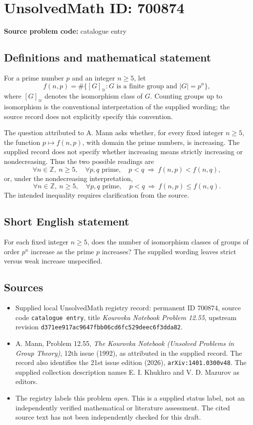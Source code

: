 \documentclass[11pt]{article}
\newcommand{\Z}{\mathbb{Z}}
\begin{document}
\section*{UnsolvedMath ID: 700874}
\textbf{Source problem code:} catalogue entry
\subsection{Definitions and mathematical statement}
For a prime number \(p\) and an integer \(n\geq 5\), let
\[
f(n,p)=\#\{[G]_{\cong}:G\text{ is a finite group and }|G|=p^n\},
\]
where \([G]_{\cong}\) denotes the isomorphism class of \(G\). Counting groups up to isomorphism is the conventional interpretation of the supplied wording; the source record does not explicitly specify this convention.

The question attributed to A. Mann asks whether, for every fixed integer \(n\geq 5\), the function \(p\mapsto f(n,p)\), with domain the prime numbers, is increasing. The supplied record does not specify whether increasing means strictly increasing or nondecreasing. Thus the two possible readings are
\[
\forall n\in\Z,\ n\geq 5,\quad
\forall p,q\text{ prime},\quad
p<q\ \Longrightarrow\ f(n,p)<f(n,q),
\]
or, under the nondecreasing interpretation,
\[
\forall n\in\Z,\ n\geq 5,\quad
\forall p,q\text{ prime},\quad
p<q\ \Longrightarrow\ f(n,p)\leq f(n,q).
\]
The intended inequality requires clarification from the source.
\subsection{Short English statement}
For each fixed integer \(n\geq 5\), does the number of isomorphism classes of groups of order \(p^n\) increase as the prime \(p\) increases? The supplied wording leaves strict versus weak increase unspecified.
\subsection{Sources}
\begin{itemize}
\item Supplied local UnsolvedMath registry record: permanent ID \(700874\), source code \texttt{catalogue entry}, title \emph{Kourovka Notebook Problem 12.55}, upstream revision \texttt{d371ee917ac9647fbb06cd6fc529deec6f3dda82}.
\item A. Mann, Problem 12.55, \emph{The Kourovka Notebook (Unsolved Problems in Group Theory)}, 12th issue (1992), as attributed in the supplied record. The record also identifies the 21st issue edition (2026), \texttt{arXiv:1401.0300v48}. The supplied collection description names E. I. Khukhro and V. D. Mazurov as editors.
\item The registry labels this problem \emph{open}. This is a supplied status label, not an independently verified mathematical or literature assessment. The cited source text has not been independently checked for this draft.
\end{itemize}
\end{document}
